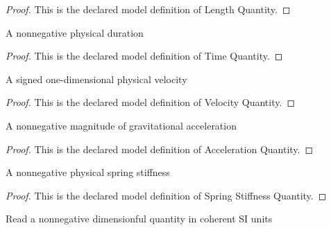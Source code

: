 \begin{proof}
  This is the declared model definition of Length Quantity.
\end{proof}
\begin{definition}
  \label{def:physics:phyx-mini-0255:phyxminiproblems-problemphyxmini0255-timequantity}
  A nonnegative physical duration
\end{definition}
\begin{proof}
  This is the declared model definition of Time Quantity.
\end{proof}
\begin{definition}
  \label{def:physics:phyx-mini-0255:phyxminiproblems-problemphyxmini0255-velocityquantity}
  A signed one-dimensional physical velocity
\end{definition}
\begin{proof}
  This is the declared model definition of Velocity Quantity.
\end{proof}
\begin{definition}
  \label{def:physics:phyx-mini-0255:phyxminiproblems-problemphyxmini0255-accelerationquantity}
  A nonnegative magnitude of gravitational acceleration
\end{definition}
\begin{proof}
  This is the declared model definition of Acceleration Quantity.
\end{proof}
\begin{definition}
  \label{def:physics:phyx-mini-0255:phyxminiproblems-problemphyxmini0255-springstiffnessquantity}
  A nonnegative physical spring stiffness
\end{definition}
\begin{proof}
  This is the declared model definition of Spring Stiffness Quantity.
\end{proof}
\begin{definition}
  \label{def:physics:phyx-mini-0255:phyxminiproblems-problemphyxmini0255-nonnegativesireadout}
  Read a nonnegative dimensionful quantity in coherent SI units
\end{definition}
